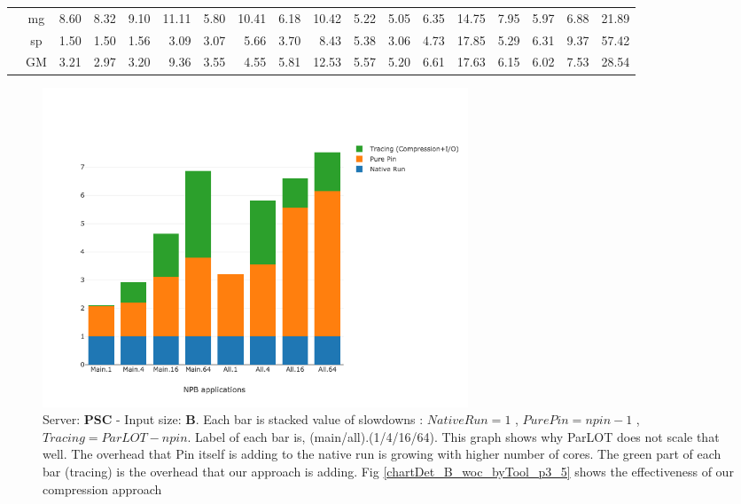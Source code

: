 \begin{table}[]
\begin{center}
{\begin{tabular}{|c|c|rrrr|rrrr|rrrr|rrrr|}
 &  mg  &  8.60  & \cellcolor{blue!25} 8.32  &  9.10  &  11.11  &  5.80  &  10.41  & \cellcolor{blue!25}  6.18  &  10.42  &   5.22  & \cellcolor{blue!25}  5.05  &   6.35  &  14.75  &  7.95  & \cellcolor{blue!25} 5.97  &  6.88  &  21.89 \\
 &  sp  &  1.50  &  1.50  &  1.56  &   3.09  &  3.07  &   5.66  & \cellcolor{blue!25}  3.70  &   8.43  &   5.38  & \cellcolor{blue!25}  3.06  &   4.73  &  17.85  &  5.29  &  6.31  &  9.37  &  57.42 \\ \cline{2-18}
 &  GM  &  3.21  & \cellcolor{blue!25} 2.97  &  3.20  &   9.36  &  3.55  &   4.55  &   5.81  &  12.53  &   5.57  & \cellcolor{blue!25}  5.20  &   6.61  &  17.63  &  6.15  & \cellcolor{blue!25} 6.02  &  7.53  &  28.54 \\
\hline 
\end{tabular} }

\end{center}
\end{table}


\begin{figure}[!t]
\centering
\includegraphics[width=5in]{figs.psc/chartDet_B_wc_byTool_p3_5.png}
\caption{Server: \textbf{PSC} - Input size: \textbf{B}. Each bar is stacked value of slowdowns : $Native Run = 1$ , $Pure Pin = npin - 1$ , $Tracing = ParLOT - npin$. Label of each bar is, (main/all).(1/4/16/64). This graph shows why ParLOT does not scale that well. The overhead that Pin itself is adding to the native run is growing with higher number of cores. The green part of each bar (tracing) is the overhead that our approach is adding. Fig \ref{chartDet_B_woc_byTool_p3_5} shows the effectiveness of our compression approach}
\label{chartDet_B_wc_byTool_p3_5}
\end{figure}


